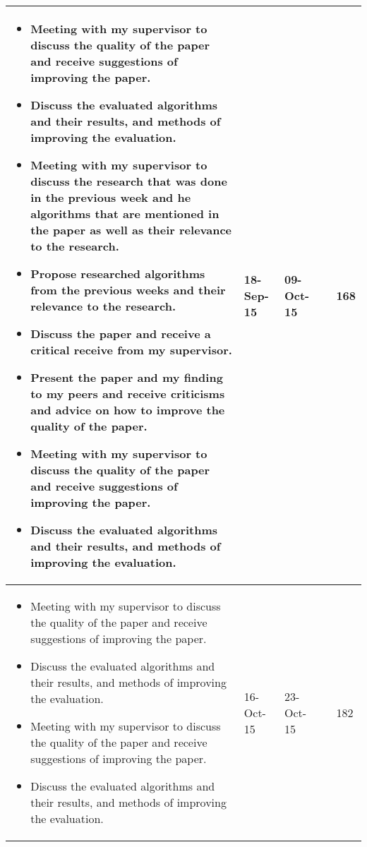 \begin{longtable}{|>{\raggedleft\arraybackslash}m{50mm}|m{10mm}|m{10mm}|m{10mm}|m{30mm}|}
			
			\hline
				\begin{itemize}  
					\item Meeting with my supervisor to discuss the quality of the paper and receive suggestions of improving the paper.
					\item Discuss the evaluated algorithms and their results, and methods of improving the evaluation.                  
					\item Meeting with my supervisor to discuss the research that was done in the previous week and he algorithms that are mentioned in the paper as well as their relevance to the research.
					\item Propose researched algorithms from the previous weeks and their relevance to the research.                                                                                         
					\item Discuss the paper and receive a critical receive from my supervisor.                                                                                                               
					\item Present the paper and my finding to my peers and receive criticisms and advice on how to improve the quality of the paper.                                                         
					\item Meeting with my supervisor to discuss the quality of the paper and receive suggestions of improving the paper.                                                                     
					\item Discuss the evaluated algorithms and their results, and methods of improving the evaluation.                                                                                       
                \end{itemize} & 18-Sep-15  & 09-Oct-15 &                & 168\\
			\hline
			
			\hline
				\begin{itemize}  
					\item Meeting with my supervisor to discuss the quality of the paper and receive suggestions of improving the paper.                                                                                                   
					\item Discuss the evaluated algorithms and their results, and methods of improving the evaluation.                                                                                                                      
					\item Meeting with my supervisor to discuss the quality of the paper and receive suggestions of improving the paper.                                                                                               
					\item Discuss the evaluated algorithms and their results, and methods of improving the evaluation.
				\end{itemize}   & 16-Oct-15  & 23-Oct-15 &                & 182\\
			\hline
                                 

\end{longtable}

